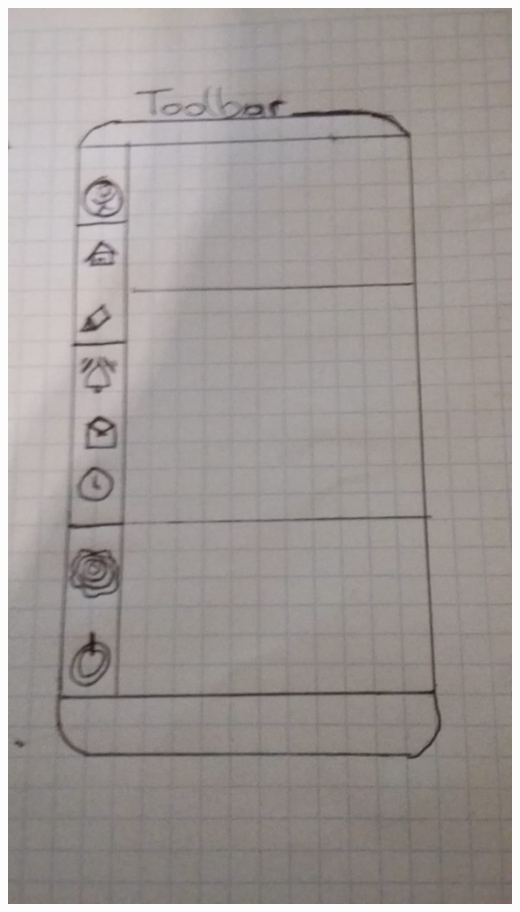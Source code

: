 \documentclass[12pt]{article}
\theoremstyle{definition}
\begin{document}
\includegraphics[scale=.2]{toolbar.jpeg} 
\end{document}
